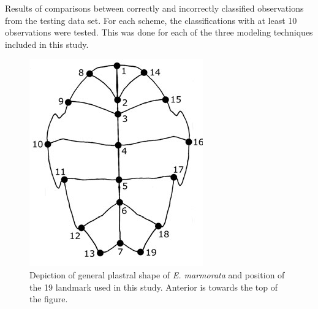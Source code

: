 \documentclass[12pt,letterpaper]{article}
\begin{document}
\begin{table}
  \begin{scriptsize}
    

    

    
  \end{scriptsize}
  \caption{Results of comparisons between correctly and incorrectly classified observations from the testing data set. For each scheme, the classifications with at least 10 observations were tested. This was done for each of the three modeling techniques included in this study.}
  \label{tab:miss_tests}
\end{table}

\begin{figure}[ht]
  \centering
  \includegraphics[height = \textheight, width = \textwidth, keepaspectratio = true]{figure/plastra}
  \caption{Depiction of general plastral shape of \textit{E. marmorata} and position of the 19 landmark used in this study. Anterior is towards the top of the figure.}
  \label{fig:plastra}
\end{figure}
\end{document}
